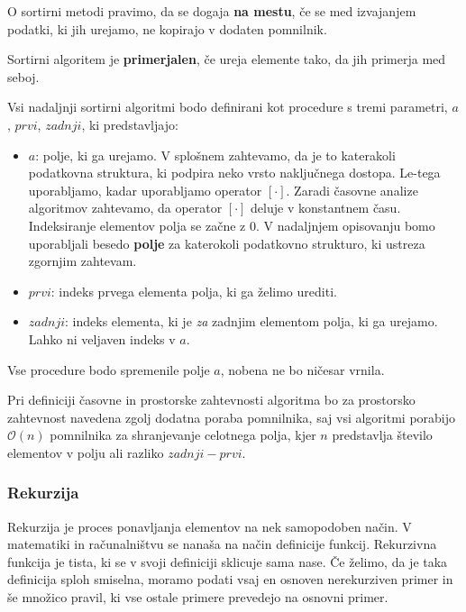 \documentclass[a4paper,oneside,12pt]{article}
\begin{document}
\begin{definicija}
  O sortirni metodi pravimo, da se dogaja \textbf{na mestu}, če se med izvajanjem podatki, ki
  jih urejamo, ne kopirajo v dodaten pomnilnik.
\end{definicija}

\begin{definicija}
  Sortirni algoritem je \textbf{primerjalen}, če ureja elemente tako, da jih primerja med seboj.
\end{definicija}

Vsi nadaljnji sortirni algoritmi bodo definirani kot procedure s tremi parametri, $a$, $prvi$,
$zadnji$, ki predstavljajo:
\begin{itemize}
  \item $a$: polje, ki ga urejamo. V splošnem zahtevamo, da je to katerakoli podatkovna
    struktura, ki podpira neko vrsto naključnega dostopa. Le-tega uporabljamo, kadar 
    uporabljamo operator $[\cdot]$. Zaradi časovne analize algoritmov zahtevamo, da operator 
    $[\cdot]$ deluje v konstantnem času. Indeksiranje elementov polja se začne z 0.
    V nadaljnjem opisovanju bomo uporabljali besedo
    \textbf{polje} za katerokoli podatkovno strukturo, ki ustreza zgornjim zahtevam.
  \item $prvi$: indeks prvega elementa polja, ki ga želimo urediti.
  \item $zadnji$: indeks elementa, ki je \emph{za} zadnjim elementom polja, ki ga urejamo. Lahko ni
    veljaven indeks v $a$.
\end{itemize}
Vse procedure bodo spremenile polje $a$, nobena ne bo ničesar vrnila.

Pri definiciji časovne in prostorske zahtevnosti algoritma bo za prostorsko zahtevnost 
navedena zgolj dodatna poraba pomnilnika, saj vsi algoritmi porabijo $\mathcal{O}(n)$ pomnilnika za
shranjevanje celotnega polja, kjer $n$ predstavlja število elementov v polju ali razliko
$zadnji - prvi$.

\subsubsection{Rekurzija}
\label{chapter:rekurzija}
Rekurzija je proces ponavljanja elementov na nek samopodoben način. V matematiki in 
računalništvu se nanaša na način definicije funkcij. Rekurzivna funkcija je tista, 
ki se v svoji definiciji sklicuje sama nase. Če želimo, da je taka definicija sploh 
smiselna, moramo podati vsaj en osnoven nerekurziven primer in še množico pravil, 
ki vse ostale primere prevedejo na osnovni primer.
\end{document}
